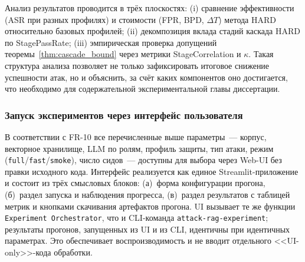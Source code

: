\documentclass[12pt, a4paper]{article}
\theoremstyle{definition}
\theoremstyle{remark}
\begin{document}
Анализ результатов проводится в трёх плоскостях: (i) сравнение эффективности (ASR при разных профилях) и стоимости (FPR, BPD, $\Delta T$) метода HARD относительно базовых профилей; (ii) декомпозиция вклада стадий каскада HARD по StagePassRate; (iii) эмпирическая проверка допущений теоремы~\ref{thm:cascade_bound} через метрики StageCorrelation и $\kappa$. Такая структура анализа позволяет не только зафиксировать итоговое снижение успешности атак, но и объяснить, за счёт каких компонентов оно достигается, что необходимо для содержательной экспериментальной главы диссертации.

\subsubsection{Запуск экспериментов через интерфейс пользователя}
\label{sec:ui_workflow}

В соответствии с FR-10 все перечисленные выше параметры~--- корпус, векторное хранилище, LLM по ролям, профиль защиты, тип атаки, режим (\texttt{full}/\texttt{fast}/\texttt{smoke}), число сидов~--- доступны для выбора через Web-UI без правки исходного кода. Интерфейс реализуется как единое Streamlit-приложение и состоит из трёх смысловых блоков: (а)~форма конфигурации прогона, (б)~раздел запуска и наблюдения прогресса, (в)~раздел результатов с таблицей метрик и кнопками скачивания артефактов прогона. UI вызывает те же функции \texttt{Experiment Orchestrator}, что и CLI-команда \texttt{attack-rag-experiment}; результаты прогонов, запущенных из UI и из CLI, идентичны при идентичных параметрах. Это обеспечивает воспроизводимость и не вводит отдельного <<UI-only>>-кода обработки.

\newpage
{}
\end{document}
